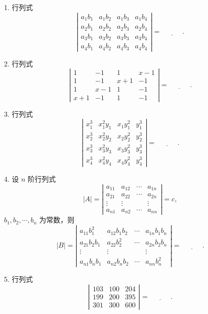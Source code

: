\documentclass[UTF8, 12pt, fontset=fandol, oneside]{ctexart}
\begin{document}
1. 行列式
\[
\left|\begin{array}{cccc}
a_1b_1&a_1b_2&a_1b_3&a_1b_4\\
a_2b_1&a_2b_2&a_2b_3&a_2b_4\\
a_3b_1&a_3b_2&a_3b_3&a_3b_4\\
a_4b_1&a_4b_2&a_4b_3&a_4b_4
\end{array}\right|=\underline{\hspace{3em}}.
\]

2. 行列式
\[
\left|\begin{array}{cccc}
1&-1&1&x-1\\
1&-1&x+1&-1\\
1&x-1&1&-1\\
x+1&-1&1&-1
\end{array}\right|=\underline{\hspace{3em}}.
\]

3. 行列式
\[
\left|\begin{array}{cccc}
x_1^3&x_1^2y_1&x_1y_1^2&y_1^3\\
x_2^3&x_2^2y_2&x_2y_2^2&y_2^3\\
x_3^3&x_3^2y_3&x_3y_3^2&y_3^3\\
x_4^3&x_4^2y_4&x_4y_4^2&y_4^3
\end{array}\right|=\underline{\hspace{3em}}.
\]

4. 设 $n$ 阶行列式
\[
|A|=\left|\begin{array}{cccc}
a_{11}&a_{12}&\cdots&a_{1n}\\
a_{21}&a_{22}&\cdots&a_{2n}\\
\vdots&\vdots&&\vdots\\
a_{n1}&a_{n2}&\cdots&a_{nn}
\end{array}\right|=c,
\]
$b_1,b_2,\cdots,b_n$ 为常数，则
\[
|B|=\left|\begin{array}{cccc}
a_{11}b_1^2&a_{12}b_1b_2&\cdots&a_{1n}b_1b_n\\
a_{21}b_2b_1&a_{22}b_2^2&\cdots&a_{2n}b_2b_n\\
\vdots&\vdots&&\vdots\\
a_{n1}b_nb_1&a_{n2}b_nb_2&\cdots&a_{nn}b_n^2
\end{array}\right|=\underline{\hspace{3em}}.
\]

5. 行列式
\[
\left|\begin{array}{ccc}
103&100&204\\
199&200&395\\
301&300&600
\end{array}\right|=\underline{\hspace{3em}}.
\]
\end{document}
